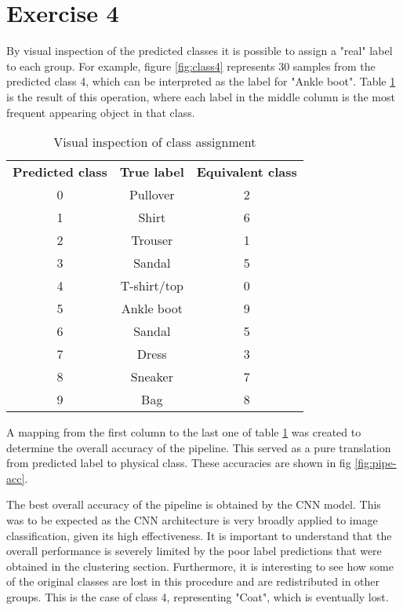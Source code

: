 \documentclass[12pt]{article}
\begin{document}
	
	\section*{Exercise 4}
	By visual inspection of the predicted classes it is possible to assign a "real" label to each group. For example, figure \ref{fig:class4} represents 30 samples from the predicted class 4, which can be interpreted as the label for "Ankle boot". Table \ref{tab:ex4-table} is the result of this operation, where each label in the middle column is the most frequent appearing object in that class.
	
	\begin{table}[h]
		\centering
		\begin{tabular}{ccc}
			\textbf{Predicted class} & \textbf{True label} & \textbf{Equivalent class} \\
			0    &  Pullover     &     2    \\
			1    &  Shirt        &     6    \\
			2    &  Trouser      &     1    \\
			3    &  Sandal       &     5    \\
			4    &  T-shirt/top  &     0    \\
			5    &  Ankle boot   &     9    \\
			6    &  Sandal       &     5    \\
			7    &  Dress        &     3    \\
			8    &  Sneaker      &     7    \\
			9    &  Bag          &     8    \\
		\end{tabular}
		\caption{Visual inspection of class assignment}
		\label{tab:ex4-table}
	\end{table}
	
	A mapping from the first column to the last one of table \ref{tab:ex4-table} was created to determine the overall accuracy of the pipeline. This served as a pure translation from predicted label to physical class. These accuracies are shown in fig \ref{fig:pipe-acc}.
	
	The best overall accuracy of the pipeline is obtained by the CNN model. This was to be expected as the CNN architecture is very broadly applied to image classification, given its high effectiveness. It is important to understand that the overall performance is severely limited by the poor label predictions that were obtained in the clustering section. Furthermore, it is interesting to see how some of the original classes are lost in this procedure and are redistributed in other groups. This is the case of class 4, representing "Coat", which is eventually lost.
	
\end{document}
